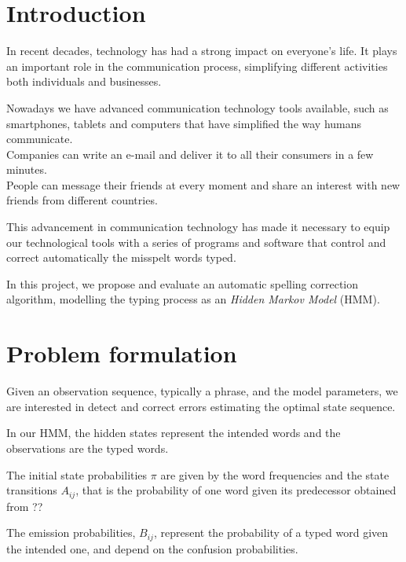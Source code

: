 \chapter{Introduction}
\label{chap:Introduction}

In recent decades, technology has had a strong impact on everyone's life.
It plays an important role in the communication process, simplifying 
different activities both individuals and businesses.

Nowadays we have advanced communication technology tools available, 
such as smartphones, tablets and computers that have simplified the way 
humans communicate. \\
Companies can write an e-mail and deliver it to all their consumers in a few 
minutes. \\
People can message their friends at every moment and share an interest 
with new friends from different countries.

This advancement in communication technology has made it necessary to 
equip our technological tools with a series of programs and software that 
control and correct automatically the misspelt words typed.

In this project, we propose and evaluate an automatic spelling correction 
algorithm, modelling the typing process as an \textit{Hidden Markov 
Model} (HMM). 


\chapter{Problem formulation} %
Given an observation sequence, typically a phrase, and the model 
parameters, we are interested in detect and correct errors estimating the 
optimal state sequence. %

In our HMM, the hidden states represent the intended words and the 
observations are the typed words. 

The initial state probabilities $\pi$ are given by the word frequencies and 
the state transitions $A_{ij}$, that is the probability of one word given 
its predecessor obtained from ?? %

The emission probabilities, $B_{ij}$, represent the probability of a typed 
word given the intended one, and depend on the confusion probabilities.


